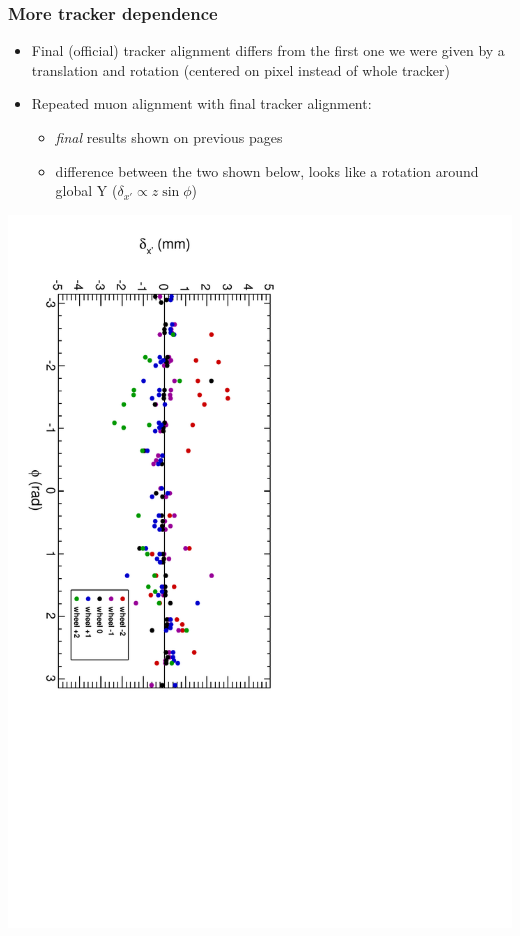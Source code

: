 \documentclass[compress]{beamer}
\begin{document}
\begin{frame}
\frametitle{More tracker dependence}
\begin{itemize}
\item Final (official) tracker alignment differs from the first one we
  were given by a translation and rotation (centered on pixel instead
  of whole tracker)
\item Repeated muon alignment with final tracker alignment:
\begin{itemize}
\item {\it final} results shown on previous pages
\item difference between the two shown below, looks like a rotation around global Y ($\delta_{x'} \propto z \sin\phi$)
\end{itemize}

\end{itemize}
\begin{center}
\includegraphics[height=0.8\linewidth, angle=90]{difference_of_tracker_centering3.pdf}
\end{center}
\end{frame}
\end{document}
